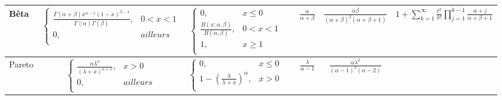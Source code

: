 \documentclass[10pt, french]{article}
\begin{document}
\begin{tabularx}{\textwidth}{ | Y | c | c | c | c | c | c  |}
Bêta & $
 \left\{
    	\begin{array}{ll}
    		\frac{\Gamma(\alpha + \beta) x^{\alpha - 1} (1-x)^{\beta- 1}}{\Gamma (\alpha)\Gamma (\beta)}, &  0 < x < 1 \\
    		0,  &  ailleurs \\
    	\end{array}
    \right.
    $& $
	\left\{
    	\begin{array}{ll}
		0, & x \le 0 \\
		\frac{B(x; \alpha, \beta)}{B (\alpha,  \beta)},&  0 < x < 1 \\
		1,  &  x \ge 1 \\
    	\end{array}
    \right.$
	& 
	& $\frac{\alpha}{\alpha +\beta}$
	& $\frac{\alpha \beta}{(\alpha +\beta)^2 (\alpha +\beta +1)}$
	& $1 +\sum_{k=1}^\infty \frac{t^k}{k!} \prod_{j=1}^{k-1} \frac{\alpha + j}{\alpha + \beta +1}$ \\ 
\hline

Pareto & $
\left\{
    	\begin{array}{ll}
    		\frac{\alpha \lambda^\alpha}{(\lambda +x)^{\alpha+1}}, &  x>0 \\
    		0,  &  ailleurs \\
    	\end{array}
    \right.
    $& $
	\left\{
    	\begin{array}{ll}
		0, & x \le 0 \\
		1 - \left(\frac{\lambda}{\lambda + x}\right)^\alpha, &  x > 0 \\
    	\end{array}
    \right.$
	& 
	& $\frac{\lambda}{\alpha -1}$
	& $\frac{\alpha \lambda^2}{(\alpha - 1)^2 (\alpha - 2)}$
	& \\ 
\hline

	
\end{tabularx}
\end{document}
